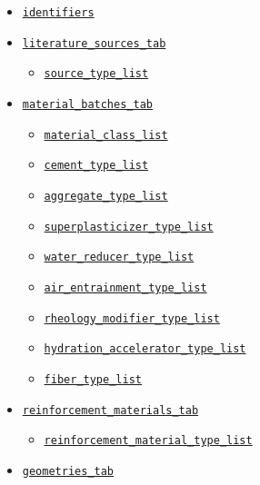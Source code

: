 \documentclass[11pt]{book}
\begin{document}
{\begin{itemize}
%
   \item \hyperref[vocab:identifiers]{\texttt{identifiers}}
%
   \item \hyperref[vocab:literature_source_tab_fields]{\texttt{literature\_sources\_tab}}
   \begin{itemize}
           \item \hyperref[vocab:source_type_list]{\texttt{source\_type\_list}}
   \end{itemize}
%
   \item \hyperref[vocab:material_batch_tab_fields]{\texttt{material\_batches\_tab}}
   \begin{itemize}
        \item \hyperref[vocab:material_class_list]{\texttt{material\_class\_list}}
        \item \hyperref[vocab:cement_type_list]{\texttt{cement\_type\_list}}
        \item \hyperref[vocab:aggregate_type_list]{\texttt{aggregate\_type\_list}}
        \item \hyperref[vocab:superplasticizer_type_list]{\texttt{superplasticizer\_type\_list}}
        \item \hyperref[vocab:water_reducer_type_list]{\texttt{water\_reducer\_type\_list}}
        \item \hyperref[vocab:air_entrainment_type_list]{\texttt{air\_entrainment\_type\_list}}
        \item \hyperref[vocab:rheology_modifier_type_list]{\texttt{rheology\_modifier\_type\_list}}
        \item \hyperref[vocab:hydration_accelerator_type_list]{\texttt{hydration\_accelerator\_type\_list}}
        \item \hyperref[vocab:fiber_type_list]{\texttt{fiber\_type\_list}}
   \end{itemize}
%
   \item \hyperref[vocab:reinforcement_materials_tab]{\texttt{reinforcement\_materials\_tab}}
   \begin{itemize}
        \item \hyperref[vocab:reinforcement_material_types_list]{\texttt{reinforcement\_material\_type\_list}}   
   \end{itemize}
%
   \item \hyperref[vocab:geometry_fields_tab]{\texttt{geometries\_tab}}
   \begin{itemize}

\end{itemize}
\end{itemize}}
\end{document}
